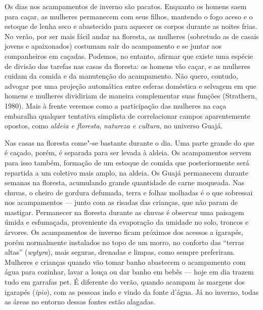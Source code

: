 Os dias nos acampamentos de inverno são pacatos. Enquanto os homens saem
para caçar, as mulheres permanecem com seus filhos, mantendo o fogo
aceso e o estoque de lenha seco e abastecido para aquecer os corpos
durante as noites frias. No verão, por ser mais fácil andar na floresta,
as mulheres (sobretudo as de casais jovens e apaixonados) costumam sair
do acampamento e se juntar aos companheiros em caçadas. Podemos, no
entanto, afirmar que existe uma espécie de divisão das tarefas nas casas
da floresta: os homens vão caçar, e as mulheres cuidam da comida e da
manutenção do acampamento. Não quero, contudo, advogar por uma projeção
automática entre esferas doméstica e selvagem em que homens e mulheres
dividiriam de maneira complementar suas funções (Strathern, 1980). Mais à
frente veremos como a participação das mulheres na caça embaralha
qualquer tentativa simplista de correlacionar campos aparentemente
opostos, como \emph{aldeia e floresta}, \emph{natureza e cultura}, no
universo Guajá.

Nas casas na floresta come"-se bastante durante o dia. Uma parte grande
do que é caçado, porém, é separada para ser levada à aldeia. Os
acampamentos servem para isso também, formação de um estoque de comida
que posteriormente será repartida a um coletivo mais amplo, na aldeia.
Os Guajá permanecem durante semanas na floresta, acumulando grande
quantidade de carne moqueada. Nas chuvas, o cheiro de gordura defumada,
terra e folhas molhadas é o que sobressai nos acampamentos --- junto com
as risadas das crianças, que não param de mastigar. Permanecer na
floresta durante as chuvas é observar uma paisagem úmida e esfumaçada,
proveniente da evaporação da umidade no solo, troncos e árvores. Os
acampamentos de inverno ficam próximos dos acessos a igarapés, porém
normalmente instalados no topo de um morro, no conforto das ``terras
altas'' (\emph{wytyra}), mais seguras, drenadas e limpas, como sempre
preferiram. Mulheres e crianças quando vão tomar banho abastecem o
acampamento com água para cozinhar, lavar a louça ou dar banho em bebês
--- hoje em dia trazem tudo em garrafas pet. É diferente do verão, quando
acampam às margens dos igarapés (\emph{ipio}), com as pessoas indo e
vindo da fonte d'água. Já no inverno, todas as áreas no entorno dessas
fontes estão alagadas.

